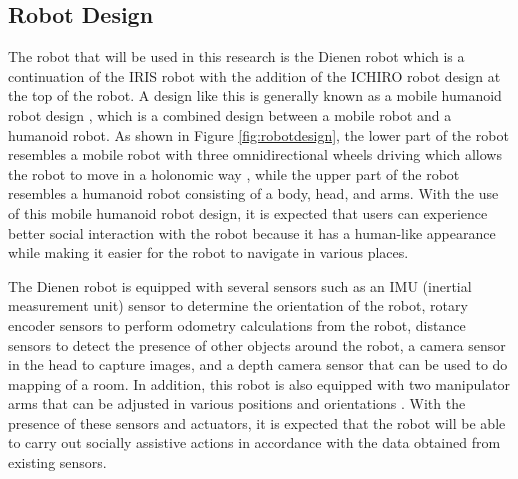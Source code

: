 \subsection{Robot Design}
\label{subsec:robotdesign}



The robot that will be used in this research is the Dienen robot which is a continuation of the IRIS robot \citep{dikairono2020}\citep{zanuar2019} with the addition of the ICHIRO robot \citep{muhtadin2019} design at the top of the robot.
A design like this is generally known as a mobile humanoid robot design \citep{mohamed2012},
  which is a combined design between a mobile robot and a humanoid robot.
As shown in Figure \ref{fig:robotdesign},
  the lower part of the robot resembles a mobile robot with three omnidirectional wheels driving which allows the robot to move in a holonomic way \citep{oliveira2008},
  while the upper part of the robot resembles a humanoid robot consisting of a body, head, and arms.
With the use of this mobile humanoid robot design,
  it is expected that users can experience better social interaction with the robot because it has a human-like appearance \citep{rossi2018} while making it easier for the robot to navigate in various places.

The Dienen robot is equipped with several sensors such as an IMU (inertial measurement unit) sensor to determine the orientation of the robot,
  rotary encoder sensors to perform odometry calculations from the robot,
  distance sensors to detect the presence of other objects around the robot,
  a camera sensor in the head to capture images,
  and a depth camera sensor that can be used to do mapping of a room.
In addition, this robot is also equipped with two manipulator arms that can be adjusted in various positions and orientations \citep{iqbal2012}.
With the presence of these sensors and actuators,
  it is expected that the robot will be able to carry out socially assistive actions in accordance with the data obtained from existing sensors.
